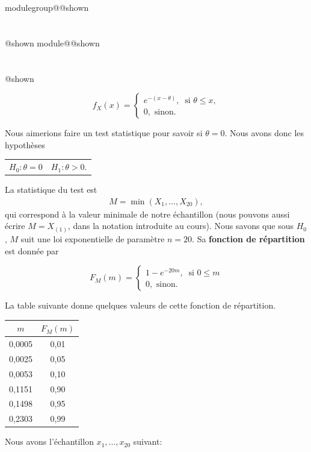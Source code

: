 \documentclass{Evaluation}
\makeatletter
\newcommand{\currentmodulekey}{}
\newcommand{\currentmoduletitle}{}
\newcommand{\currentgroupkey}{}
\newcommand{\currentgrouptitle}{}
\newcommand{\showmoduleifneeded}{%
  \ifx\currentgroupkey\empty\else
    \expandafter\ifx\csname modulegroup@\currentgroupkey @shown\endcsname\relax
      \section*{\currentgrouptitle}%
      \expandafter\gdef\csname modulegroup@\currentgroupkey @shown\endcsname{1}%
    \fi
  \fi
  \expandafter\ifx\csname module@\currentmodulekey @shown\endcsname\relax
    \section*{\currentmoduletitle}%
    \expandafter\gdef\csname module@\currentmodulekey @shown\endcsname{1}%
  \fi
}
\newenvironment{H23}{\showmoduleifneeded}{}
\makeatother
\begin{document}
\begin{questions}
\begin{H23}
 \begin{equation*}
  f_X(x) = \begin{cases}
         e^{-(x-\theta)},\ \text{  si  } \theta \leq x , \\
        0, \text{ sinon.}
        \end{cases}
 \end{equation*}

Nous aimerions faire un test statistique pour savoir si $\theta=0$. Nous avons donc les hypothèses

\begin{table}[ht]
    \centering
    \begin{tabular}{cc}
         $H_0: \theta=0$ & $H_1: \theta > 0$.
    \end{tabular}
\end{table}
La statistique du test est
\begin{align*}
    M=\min (X_1,...,X_{20}),
\end{align*}
qui correspond à la valeur minimale de notre échantillon (nous pouvons aussi écrire $M=X_{(1)}$, dans la notation introduite au cours).
Nous savons que sous $H_0$, $M$ suit une loi exponentielle de paramètre $n=20$. Sa \textbf{fonction de répartition} est donnée par 

 \begin{equation*}
  F_M(m) = \begin{cases}
         1-e^{-20m},\ \text{  si  } 0\leq m \\
        0, \text{ sinon.}
        \end{cases}
 \end{equation*}

La table suivante donne quelques valeurs de cette fonction de répartition.
\begin{table}[ht]
    \centering
\begin{tabular}{|cc|}
  \hline
 $m$ & $F_M(m)$ \\ 
  \hline
    0,0005 & 0,01 \\
    0,0025 & 0,05 \\
    0,0053 & 0,10 \\
    0,1151 & 0,90 \\
    0,1498 & 0,95 \\ 
    0,2303 & 0,99 \\ 
  \hline
\end{tabular}
\end{table}

Nous avons l'échantillon $x_1,\hdots,x_{20}$ suivant:


\end{H23}
\end{questions}
\end{document}
